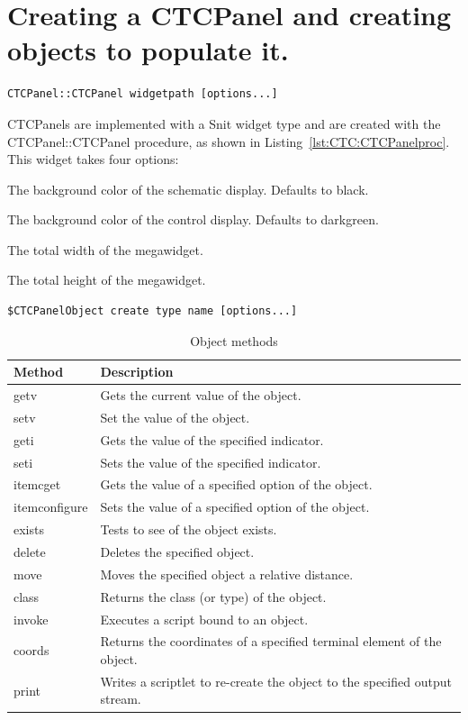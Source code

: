\section{Creating a CTCPanel and creating objects to populate it.}
\begin{lstlisting}[caption={CTCPanel::CTCPanel procedure},
		   label={lst:CTC:CTCPanelproc}]
CTCPanel::CTCPanel widgetpath [options...]
\end{lstlisting}
CTCPanels are implemented with a Snit widget type and are created with
the CTCPanel::CTCPanel procedure, as shown in
Listing~\ref{lst:CTC:CTCPanelproc}. This widget takes four options:
\begin{description}
\item[-schematicbackground] The background color of the schematic
display. Defaults to black.
\item[-controlbackground] The background color of the control display.
Defaults to darkgreen.
\item[-width] The total width of the megawidget.
\item[-height] The total height of the megawidget.
\end{description}
\begin{lstlisting}[caption={CTCPanel::CTCPanel creating objects},
		   label={lst:CTC:CTCPanelcreate}]
$CTCPanelObject create type name [options...]
\end{lstlisting}
\begin{table}[hbpt]
\begin{centering}
\begin{tabular}{|l|p{3in}|}
\hline
Method & Description \\
\hline
\hline
getv & Gets the current value of the object.\\
\hline
setv & Set the value of the object.\\
\hline
geti & Gets the value of the specified indicator. \\
\hline
seti & Sets the value of the specified indicator. \\
\hline
itemcget & Gets the value of a specified option of the object.\\
\hline
itemconfigure & Sets the value of a specified option of the object.\\
\hline
exists & Tests to see of the object exists.\\
\hline
delete & Deletes the specified object.\\
\hline
move & Moves the specified object a relative distance.\\
\hline
class & Returns the class (or type) of the object.\\
\hline
invoke & Executes a script bound to an object.\\
\hline
coords & Returns the coordinates of a specified terminal element of the
object. \\
\hline
print & Writes a scriptlet to re-create the object to the specified
output stream.\\
\hline
\end{tabular}
\caption{Object methods}
\label{tab:CTC:ObjectMethods}
\end{centering}
\end{table}
